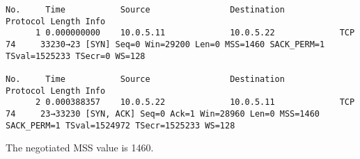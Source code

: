 \begin{verbatim}
No.     Time           Source                Destination           Protocol Length Info
      1 0.000000000    10.0.5.11             10.0.5.22             TCP      74     33230→23 [SYN] Seq=0 Win=29200 Len=0 MSS=1460 SACK_PERM=1 TSval=1525233 TSecr=0 WS=128

No.     Time           Source                Destination           Protocol Length Info
      2 0.000388357    10.0.5.22             10.0.5.11             TCP      74     23→33230 [SYN, ACK] Seq=0 Ack=1 Win=28960 Len=0 MSS=1460 SACK_PERM=1 TSval=1524972 TSecr=1525233 WS=128

\end{verbatim}

The negotiated MSS value is 1460.